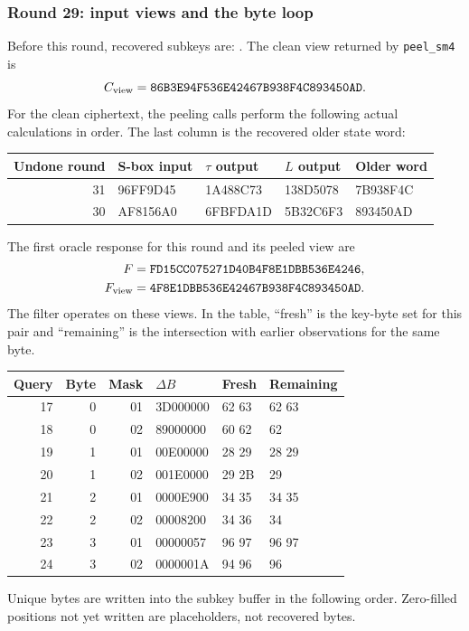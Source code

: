 \subsubsection*{Round 29: input views and the byte loop}
Before this round, recovered subkeys are:
.
The clean view returned by \texttt{peel\_sm4} is
\[C_{\rm view}=\texttt{86B3E94F536E42467B938F4C893450AD}.\]
For the clean ciphertext, the peeling calls perform the following actual calculations in order. The last column is the recovered older state word:
\begin{center}\small\begin{tabular}{rllll}\toprule
Undone round & S-box input & $\tau$ output & $L$ output & Older word\\\midrule
31 & 96FF9D45 & 1A488C73 & 138D5078 & 7B938F4C\\
30 & AF8156A0 & 6FBFDA1D & 5B32C6F3 & 893450AD\\
\bottomrule\end{tabular}\end{center}
The first oracle response for this round and its peeled view are
\[\begin{aligned}F&=\texttt{FD15CC075271D40B4F8E1DBB536E4246},\\F_{\rm view}&=\texttt{4F8E1DBB536E42467B938F4C893450AD}.\end{aligned}\]
The filter operates on these views. In the table, ``fresh'' is the key-byte set for this pair and ``remaining'' is the intersection with earlier observations for the same byte.
\begin{center}\small\begin{tabular}{rrrlll}\toprule
Query & Byte & Mask & $\Delta B$ & Fresh & Remaining\\\midrule
17 & 0 & 01 & 3D000000 & 62 63 & 62 63\\
18 & 0 & 02 & 89000000 & 60 62 & 62\\
19 & 1 & 01 & 00E00000 & 28 29 & 28 29\\
20 & 1 & 02 & 001E0000 & 29 2B & 29\\
21 & 2 & 01 & 0000E900 & 34 35 & 34 35\\
22 & 2 & 02 & 00008200 & 34 36 & 34\\
23 & 3 & 01 & 00000057 & 96 97 & 96 97\\
24 & 3 & 02 & 0000001A & 94 96 & 96\\
\bottomrule\end{tabular}\end{center}
Unique bytes are written into the subkey buffer in the following order. Zero-filled positions not yet written are placeholders, not recovered bytes.
